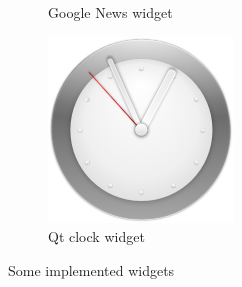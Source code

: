 \begin{figure}[htbp]
	\hfill
        \begin{subfigure}[b]{0.38\textwidth}
                \caption{Google News widget}
                \label{img:wid:news}
        \end{subfigure}
	\hfill
        \begin{subfigure}[b]{0.28\textwidth}
                \includegraphics[width=\textwidth]{images/software/clock.png}
                \caption{Qt clock widget}
                \label{img:wid:time}
        \end{subfigure}
        \caption{Some implemented widgets}
        \label{fig:Widgets}
\end{figure}

